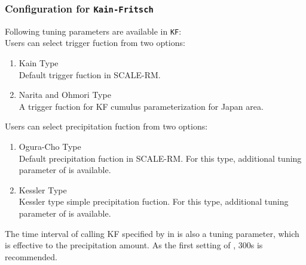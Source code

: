 \subsubsection{Configuration for \texttt{Kain-Fritsch}}

Following tuning parameters are available in \verb|KF|:
\\
Users can select trigger fuction from two options:
\begin{enumerate}
\item Kain Type \citet{kain_2004} \\
  Default trigger fuction in SCALE-RM.
\item Narita and Ohmori Type \citet{narita_2007} \\
  A trigger fuction for KF cumulus parameterization for Japan area. 
\end{enumerate}
Users can select precipitation fuction from two options:
\begin{enumerate}
\item Ogura-Cho Type \citet{ogura_1973} \\
  Default precipitation fuction in SCALE-RM. For this type, additional tuning parameter of  is available.
\item Kessler Type \citet{kessler_1969} \\
  Kessler type simple precipitation fuction. For this type, additional tuning parameter of  is available.
\end{enumerate}

The time interval of calling KF specified by  in  is also a tuning parameter, which is effective to the precipitation amount. As the first setting of , 300s is recommended.



